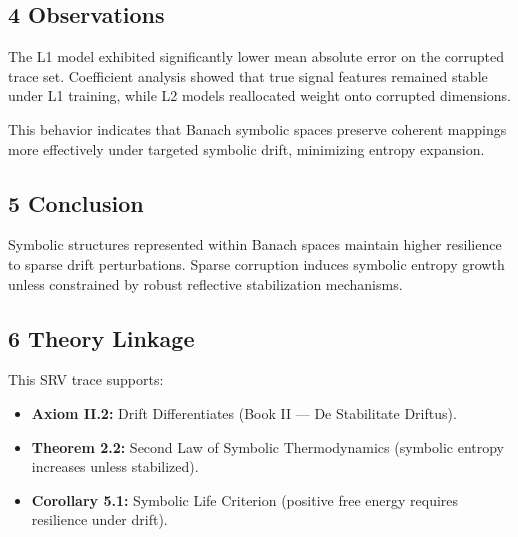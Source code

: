 \subsection*{4 Observations}
\label{subsection:trace2_observations}

The L1 model exhibited significantly lower mean absolute error on the corrupted trace set. Coefficient analysis showed that true signal features remained stable under L1 training, while L2 models reallocated weight onto corrupted dimensions.

This behavior indicates that Banach symbolic spaces preserve coherent mappings more effectively under targeted symbolic drift, minimizing entropy expansion.

\subsection*{5 Conclusion}
\label{subsection:trace2_conclusion}

Symbolic structures represented within Banach spaces maintain higher resilience to sparse drift perturbations. Sparse corruption induces symbolic entropy growth unless constrained by robust reflective stabilization mechanisms.

\subsection*{6 Theory Linkage}
\label{subsection:trace2_theory_linkage}

This SRV trace supports:
\begin{itemize}
    \item \textbf{Axiom II.2:} Drift Differentiates (Book II — De Stabilitate Driftus).
    \item \textbf{Theorem 2.2:} Second Law of Symbolic Thermodynamics (symbolic entropy increases unless stabilized).
    \item \textbf{Corollary 5.1:} Symbolic Life Criterion (positive free energy requires resilience under drift).
\end{itemize}
